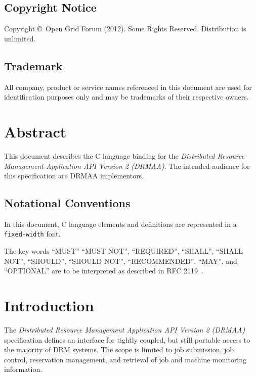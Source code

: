 \documentclass{article}
\newcommand{\copyrightyears}{2012}
\newcommand{\h}[1]{\texttt{#1}}
\begin{document}
\subsection*{Copyright Notice}

Copyright \copyright \ Open Grid Forum (\copyrightyears).  Some Rights Reserved.  
Distribution is unlimited.\\

\subsection*{Trademark}

All company, product or service names referenced in this document are used for identification purposes only and may be trademarks of their respective owners. \\

\section*{Abstract}

This document describes the C language binding for the \emph{Distributed Resource Management Application API Version 2 (DRMAA)}. The intended audience for this specification are DRMAA implementors. \\

\newpage

\subsection*{Notational Conventions}
\label{sec:rfc2119}

In this document, C language elements and definitions are represented in a \h{fixed-width} font. 

The key words \enquote{MUST} \enquote{MUST NOT}, \enquote{REQUIRED}, \enquote{SHALL}, \enquote{SHALL NOT}, \enquote{SHOULD}, \enquote{SHOULD NOT}, \enquote{RECOMMENDED}, \enquote{MAY},  and \enquote{OPTIONAL} are to be interpreted as described in RFC 2119~\cite{rfc2119}. 

\newpage
\tableofcontents
\newpage

\section{Introduction}
\label{sec:introduction}

 The \emph{Distributed Resource Management Application API Version 2 (DRMAA)} specification defines an interface for tightly coupled, but still portable access to the majority of DRM systems. The scope is limited to job submission, job control, reservation management, and retrieval of job and machine monitoring information. 
\end{document}
